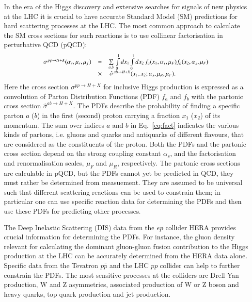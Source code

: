In the era of the Higgs discovery and extensive searches
for signals of new physics at the LHC it is crucial
to have accurate Standard Model (SM) predictions for
hard scattering processes at the LHC.
The most common approach to calculate the SM cross sections for  
such reactions is to use collinear factorisation in perturbative QCD (pQCD):
\begin{equation}
\small
\begin{array}{lcl}
\sigma^{pp\rightarrow H + X}(\alpha_s,\mu_r,\mu_f) & = &
\sum\limits_{a,b}\,  \int\limits_{0}\limits^{1} dx_1 \int\limits_{0}\limits^{1} dx_2\, f_a(x_1,\alpha_s,\mu_F) 
 f_b(x_2,\alpha_s,\mu_F)\\ 
& \times & \, \hat{\sigma}^{ab \rightarrow H + X}(x_1,x_2;\alpha_s,\mu_R,\mu_F).
\label{eq:fact}
\end{array}
\end{equation}
Here the cross section $\sigma^{pp\rightarrow H + X}$ for inclusive
Higgs production is expressed
as a convolution of Parton Distribution Functions (PDF) $f_a$ and $f_b$
with the partonic cross section
$\hat{\sigma}^{ab \rightarrow H + X}$.
%
The PDFs describe 
the probability of finding a specific parton $a$ ($b$) in the first (second) proton carrying a fraction $x_1$ ($x_2$) of its momentum.
%
The sum over indices $a$ and $b$ in Eq.~\ref{eq:fact} indicates the various 
kinds of partons,
i.e. gluons and quarks and antiquarks of different flavours, 
that are considered
as the constituents of the proton.
%
Both the PDFs and the partonic cross section depend on the strong coupling
constant $\alpha_s$, and the factorisation and renormalisation scales,
$\mu_F$ and $\mu_R$, respectively.
%
The partonic cross sections are calculable in pQCD, but
the PDFs cannot yet be predicted in QCD, they must rather be 
determined from measuement. They are assumed 
to be universal such that different scattering reactions can be used 
to constrain them; in particular one can use specific reaction data 
for determining the PDFs and then use these PDFs for
predicting other processes.
%

The Deep Inelastic Scattering (DIS) data from the $ep$ collider HERA provides crucial information for determining the PDFs.
%
For instance, the gluon density relevant
for calculating the dominant gluon-gluon fusion contribution to the Higgs production
at the LHC can be accurately determined from the HERA data alone.
%
Specific data from the Tevatron $p\bar{p}$ and the LHC $pp$ collider
can help to further constrain the PDFs.
%
The most sensitive processes at the  colliders are
Drell Yan production, W and Z asymmetries, associated production of W or Z boson 
and heavy quarks, top quark production and jet production.
%

